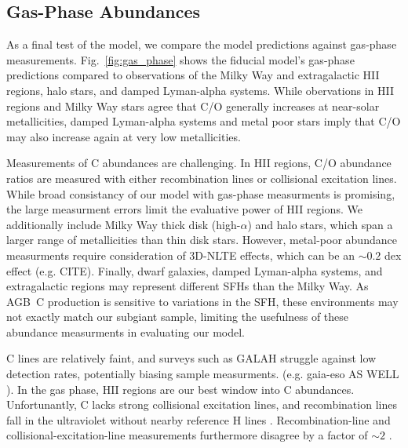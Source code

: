 \documentclass[fleqn,
usenatbib]{mnras}
\newcommand{\agb}{AGB}
\newcommand{\sfh}{SFH} %
\newcommand{\about}[1]{${\sim} #1$}
\begin{document}
\subsection{Gas-Phase Abundances}\label{sec:gas}

As a final test of the model, we compare the model predictions against gas-phase measurements. Fig.~\ref{fig:gas_phase} shows the fiducial model's gas-phase predictions compared to observations of the Milky Way and extragalactic HII regions, halo stars, and damped Lyman-alpha systems. 
While obervations in HII regions and Milky Way stars agree that C/O generally increases at near-solar metallicities, damped Lyman-alpha systems and metal poor stars imply that C/O may also increase again at very low metallicities. 



Measurements of C abundances are challenging. 
In HII regions, C/O abundance ratios are measured with either recombination lines or collisional excitation lines. While broad consistancy of our model with gas-phase measurments is promising, the large measurment errors limit the evaluative power of HII regions.
We additionally include Milky Way thick disk (high-$\alpha$) and halo stars, which span a larger range of metallicities than thin disk stars. However, metal-poor abundance measurments require consideration of 3D-NLTE effects, which can be an \about{0.2} dex effect  (e.g. CITE). 
Finally, dwarf galaxies, damped Lyman-alpha systems, and extragalactic regions may represent different \sfh{}s than the Milky Way.
As \agb\ C production is sensitive to variations in the \sfh, these environments may not exactly match our subgiant sample, limiting the usefulness of these abundance measurments in evaluating our model.

C lines are relatively faint, and surveys such as GALAH struggle against low detection rates, potentially biasing sample measurments. 
(e.g. gaia-eso AS WELL \citealt{franchini+20}).
In the gas phase, HII regions are our best window into C abundances. Unfortunantly, C lacks strong collisional excitation lines, and recombination lines fall in the ultraviolet without nearby reference H lines \citep{skillman+20}. Recombination-line and collisional-excitation-line measurements furthermore disagree by a factor of \about{2} \citep{GR07}. 
\end{document}
